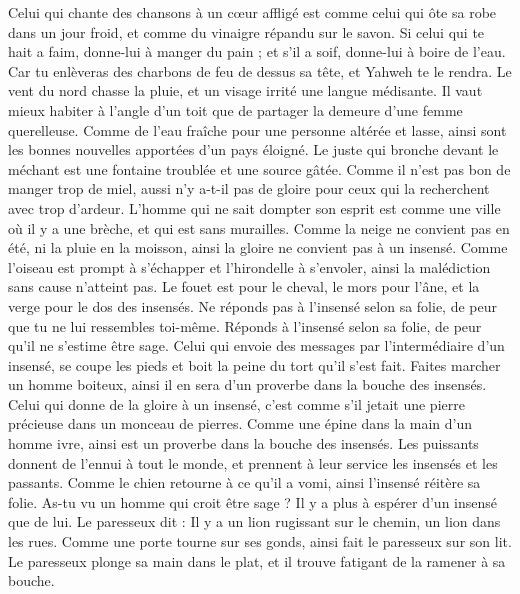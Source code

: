 \begin{multicols}{2}
Celui qui chante des chansons à un cœur affligé est comme celui qui ôte sa robe dans un jour froid, et comme du vinaigre répandu sur le savon.
Si celui qui te hait a faim, donne-lui à manger du pain ; et s'il a soif, donne-lui à boire de l'eau.
Car tu enlèveras des charbons de feu de dessus sa tête, et Yahweh te le rendra.
Le vent du nord chasse la pluie, et un visage irrité une langue médisante.
Il vaut mieux habiter à l'angle d'un toit que de partager la demeure d'une femme querelleuse.
Comme de l'eau fraîche pour une personne altérée et lasse, ainsi sont les bonnes nouvelles apportées d'un pays éloigné.
Le juste qui bronche devant le méchant est une fontaine troublée et une source gâtée.
Comme il n'est pas bon de manger trop de miel, aussi n'y a-t-il pas de gloire pour ceux qui la recherchent avec trop d'ardeur.
L'homme qui ne sait dompter son esprit est comme une ville où il y a une brèche, et qui est sans murailles.
\VerseOne{}Comme la neige ne convient pas en été, ni la pluie en la moisson, ainsi la gloire ne convient pas à un insensé.
Comme l'oiseau est prompt à s'échapper et l'hirondelle à s'envoler, ainsi la malédiction sans cause n'atteint pas.
Le fouet est pour le cheval, le mors pour l'âne, et la verge pour le dos des insensés.
Ne réponds pas à l'insensé selon sa folie, de peur que tu ne lui ressembles toi-même.
Réponds à l'insensé selon sa folie, de peur qu'il ne s'estime être sage.
Celui qui envoie des messages par l'intermédiaire d'un insensé, se coupe les pieds et boit la peine du tort qu'il s'est fait.
Faites marcher un homme boiteux, ainsi il en sera d'un proverbe dans la bouche des insensés.
Celui qui donne de la gloire à un insensé, c'est comme s'il jetait une pierre précieuse dans un monceau de pierres.
Comme une épine dans la main d'un homme ivre, ainsi est un proverbe dans la bouche des insensés.
Les puissants donnent de l'ennui à tout le monde, et prennent à leur service les insensés et les passants.
Comme le chien retourne à ce qu'il a vomi, ainsi l'insensé réitère sa folie.
As-tu vu un homme qui croit être sage ? Il y a plus à espérer d'un insensé que de lui.
Le paresseux dit : Il y a un lion rugissant sur le chemin, un lion dans les rues.
Comme une porte tourne sur ses gonds, ainsi fait le paresseux sur son lit.
Le paresseux plonge sa main dans le plat, et il trouve fatigant de la ramener à sa bouche.

\end{multicols}
